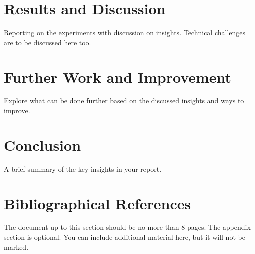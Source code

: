 \documentclass[conference]{IEEEtran}
\begin{document}
\section{Results and Discussion}
{\color{blue}Reporting on the experiments with discussion on insights. Technical challenges are to be discussed here too.}

\section{Further Work and Improvement}
{\color{blue}Explore what can be done further based on the discussed insights and ways to improve.}


\section{Conclusion}
{\color{blue}A brief summary of the key insights in your report.}

\section{Bibliographical References}\label{sec:reference}





\appendix
{\color{blue}The document up to this section should be no more than 8 pages. The appendix section is optional. You can include additional material here, but it will not be marked.}
\end{document}
